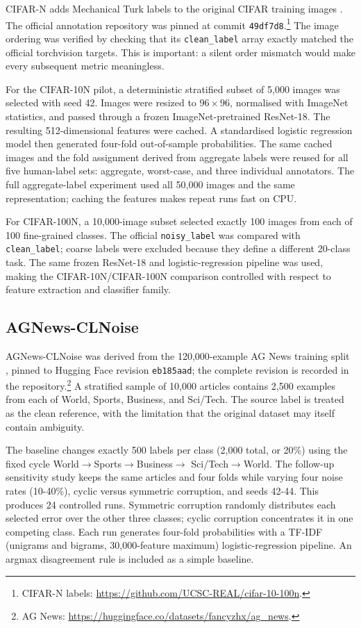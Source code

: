 \documentclass[11pt]{article}
\begin{document}
CIFAR-N adds Mechanical Turk labels to the original CIFAR training images
\citep{wei2022learning}. The official annotation repository was pinned at
commit \texttt{49df7d8}.\footnote{CIFAR-N labels:
\url{https://github.com/UCSC-REAL/cifar-10-100n}.} The image ordering was verified by checking that its
\texttt{clean\_label} array exactly matched the official torchvision targets.
This is important: a silent order mismatch would make every subsequent metric
meaningless.

For the CIFAR-10N pilot, a deterministic stratified subset of 5,000 images was
selected with seed 42. Images were resized to $96\times96$, normalised with
ImageNet statistics, and passed through a frozen ImageNet-pretrained ResNet-18.
The resulting 512-dimensional features were cached. A standardised logistic
regression model then generated four-fold out-of-sample probabilities. The
same cached images and the fold assignment derived from aggregate labels were
reused for all five human-label sets: aggregate, worst-case, and three
individual annotators. The full aggregate-label experiment used all 50,000
images and the same representation; caching the features makes repeat runs
fast on CPU.

For CIFAR-100N, a 10,000-image subset selected exactly 100 images from each of
100 fine-grained classes. The official \texttt{noisy\_label} was compared with
\texttt{clean\_label}; coarse labels were excluded because they define a
different 20-class task. The same frozen ResNet-18 and logistic-regression
pipeline was used, making the CIFAR-10N/CIFAR-100N comparison controlled with
respect to feature extraction and classifier family.

\subsection{AGNews-CLNoise}

AGNews-CLNoise was derived from the 120,000-example AG News training split
\citep{zhang2015character}, pinned to Hugging Face revision
\texttt{eb185aad}; the complete revision is recorded in the
repository.\footnote{AG News:
\url{https://huggingface.co/datasets/fancyzhx/ag_news}.} A
stratified sample of 10,000 articles contains 2,500 examples from each of
World, Sports, Business, and Sci/Tech. The source label is treated as the clean
reference, with the limitation that the original dataset may itself contain
ambiguity.

The baseline changes exactly 500 labels per class (2,000 total, or 20\%) using
the fixed cycle World$\rightarrow$Sports$\rightarrow$Business$\rightarrow$
Sci/Tech$\rightarrow$World. The follow-up sensitivity study keeps the same
articles and four folds while varying four noise rates (10-40\%), cyclic
versus symmetric corruption, and seeds 42-44. This produces 24 controlled
runs. Symmetric corruption randomly distributes each selected error over the
other three classes; cyclic corruption concentrates it in one competing class.
Each run generates four-fold probabilities with a TF-IDF (unigrams and
bigrams, 30,000-feature maximum) logistic-regression pipeline. An argmax
disagreement rule is included as a simple baseline.
\end{document}
